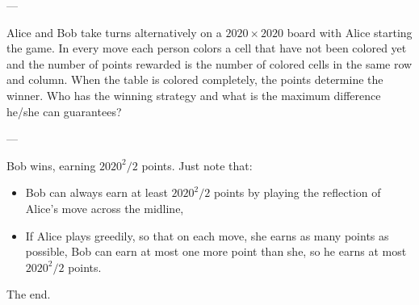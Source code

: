 
---

Alice and Bob take turns alternatively on a $2020\times2020$ board with Alice starting the game. In every move each person colors a cell that have not been colored yet and the number of points rewarded is the number of colored cells in the same row and column. When the table is colored completely, the points determine the winner. Who has the winning strategy and what is the maximum difference he/she can guarantees?

---

Bob wins, earning $2020^2/2$ points. Just note that:
\begin{itemize}
    \item Bob can always earn at least $2020^2/2$ points by playing the reflection of Alice's move across the midline,
    \item If Alice plays greedily, so that on each move, she earns as many points as possible, Bob can earn at most one more point than she, so he earns at most $2020^2/2$ points.
\end{itemize}
The end.

